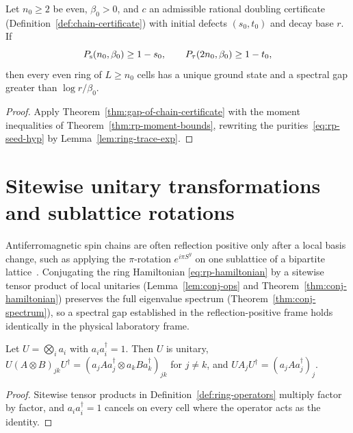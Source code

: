 \begin{theorem}
  \label{thm:rp-gap}
  \leanok
  Let \(n_0 \ge 2\) be even, \(\beta_0 > 0\), and \(c\) an admissible rational doubling certificate
  (Definition~\ref{def:chain-certificate}) with initial defects \((s_0, t_0)\) and decay base \(r\).
  If
  \begin{equation}
    \label{eq:rp-seed-hyp}
    P_{\mathrm{s}}(n_0, \beta_0) \ge 1 - s_0, \qquad P_{\tau}(2n_0, \beta_0) \ge 1 - t_0,
  \end{equation}
  then every even ring of \(L \ge n_0\) cells has a unique ground state and a spectral gap greater
  than \(\log r / \beta_0\).
\end{theorem}
\begin{proof}
  \leanok
  Apply Theorem~\ref{thm:gap-of-chain-certificate} with the moment inequalities of
  Theorem~\ref{thm:rp-moment-bounds}, rewriting the purities~\eqref{eq:rp-seed-hyp} by
  Lemma~\ref{lem:ring-trace-exp}.
\end{proof}

\section{Sitewise unitary transformations and sublattice rotations}

Antiferromagnetic spin chains are often reflection positive only after a local basis change, such
as applying the \(\pi\)-rotation \(e^{i\pi S^y}\) on one sublattice of a bipartite
lattice~\cite{Dyson1978Phase, Biskup2009Reflection}. Conjugating the ring Hamiltonian
\eqref{eq:rp-hamiltonian} by a sitewise tensor product of local unitaries
(Lemma~\ref{lem:conj-ops} and Theorem~\ref{thm:conj-hamiltonian}) preserves the full eigenvalue
spectrum (Theorem~\ref{thm:conj-spectrum}), so a spectral gap established in the reflection-positive
frame holds identically in the physical laboratory frame.

\begin{lemma}
  \label{lem:conj-ops}
  \leanok
  Let \(U = \bigotimes_i a_i\) with \(a_i a_i^\dagger = 1\). Then \(U\) is unitary,
  \(U (A \otimes B)_{jk} U^\dagger = (a_j A a_j^\dagger \otimes a_k B a_k^\dagger)_{jk}\) for
  \(j \ne k\), and \(U A_j U^\dagger = (a_j A a_j^\dagger)_j\).
\end{lemma}
\begin{proof}
  \leanok
  Sitewise tensor products in Definition~\ref{def:ring-operators} multiply factor by factor, and
  \(a_i a_i^\dagger = 1\) cancels on every cell where the operator acts as the identity.
\end{proof}

